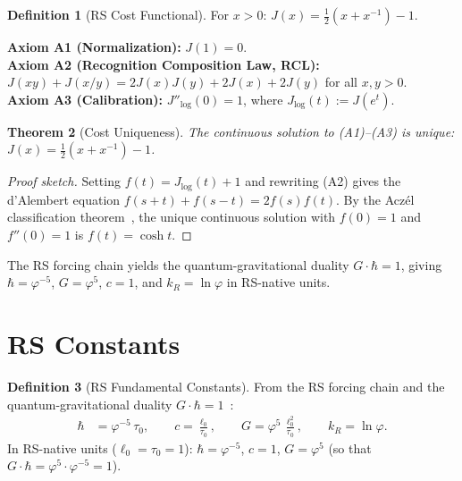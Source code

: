 \documentclass[12pt,a4paper]{article}
\newtheorem{theorem}{Theorem}[section]
\theoremstyle{definition}
\newtheorem{definition}[theorem]{Definition}
\theoremstyle{remark}
\begin{document}
\begin{definition}[RS Cost Functional]
For $x > 0$: $J(x) = \tfrac{1}{2}(x + x^{-1}) - 1$.
\end{definition}

\noindent\textbf{Axiom A1 (Normalization):} $J(1) = 0$.\\
\textbf{Axiom A2 (Recognition Composition Law, RCL):}
$J(xy) + J(x/y) = 2J(x)J(y) + 2J(x) + 2J(y)$ for all $x, y > 0$.\\
\textbf{Axiom A3 (Calibration):} $J''_{\log}(0) = 1$, where
$J_{\log}(t) := J(e^t)$.

\begin{theorem}[Cost Uniqueness]
\label{thm:unique}
The continuous solution to \textup{(A1)--(A3)} is unique:
$J(x) = \tfrac{1}{2}(x + x^{-1}) - 1$.
\end{theorem}

\begin{proof}[Proof sketch]
Setting $f(t) = J_{\log}(t) + 1$ and rewriting \textup{(A2)} gives the
d'Alembert equation $f(s+t) + f(s-t) = 2f(s)f(t)$.  By the Acz\'el
classification theorem~\cite{Aczel1966}, the unique continuous solution
with $f(0) = 1$ and $f''(0) = 1$ is $f(t) = \cosh t$.
\end{proof}

\noindent The RS forcing chain yields the quantum-gravitational duality
$G \cdot \hbar = 1$, giving $\hbar = \varphi^{-5}$, $G = \varphi^5$,
$c = 1$, and $k_R = \ln\varphi$ in RS-native units.

\section{RS Constants}
\label{sec:constants}

\begin{definition}[RS Fundamental Constants]
From the RS forcing chain and the quantum-gravitational
duality $G \cdot \hbar = 1$~\cite{RS_Axioms}:
\begin{align}
  \hbar &= \varphi^{-5}\,\tau_0, \qquad
  c = \frac{\ell_0}{\tau_0}, \qquad
  G = \varphi^5\,\frac{\ell_0^2}{\tau_0}, \qquad
  k_R = \ln\varphi.
\end{align}
In RS-native units ($\ell_0 = \tau_0 = 1$):
$\hbar = \varphi^{-5}$, $c = 1$, $G = \varphi^5$
(so that $G\cdot\hbar = \varphi^5 \cdot \varphi^{-5} = 1$).
\end{definition}
\end{document}
